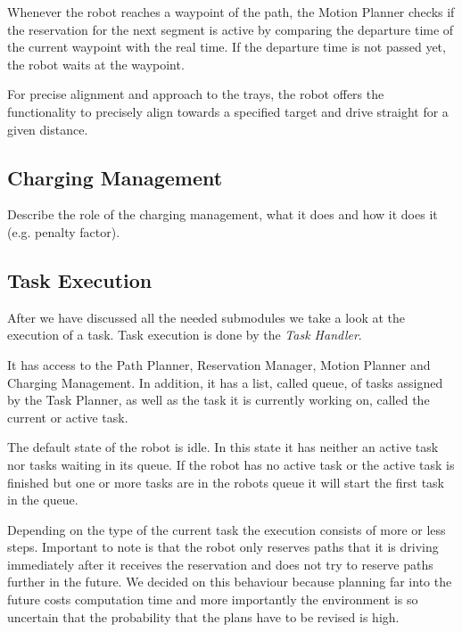 \documentclass[journal]{IEEEtran}
\begin{document}
Whenever the robot reaches a waypoint of the path, the Motion Planner checks if the reservation for the next segment is active by comparing the departure time of the current waypoint with the real time. If the departure time is not passed yet, the robot waits at the waypoint.

For precise alignment and approach to the trays, the robot offers the functionality to precisely align towards a specified target and drive straight for a given distance.

\subsection{Charging Management}
\label{subsec:charging_management}
Describe the role of the charging management, what it does and how it does it (e.g. penalty factor).


\subsection{Task Execution}
\label{subsec:task_execution}
After we have discussed all the needed submodules we take a look at the execution of a task. Task execution is done by the \textit{Task Handler}.

It has access to the Path Planner, Reservation Manager, Motion Planner and Charging Management. In addition, it has a list, called queue, of tasks assigned by the Task Planner, as well as the task it is currently working on, called the current or active task.

The default state of the robot is idle. In this state it has neither an active task nor tasks waiting in its queue. If the robot has no active task or the active task is finished but one or more tasks are in the robots queue it will start the first task in the queue.

Depending on the type of the current task the execution consists of more or less steps. Important to note is that the robot only reserves paths that it is driving immediately after it receives the reservation and does not try to reserve paths further in the future. We decided on this behaviour because planning far into the future costs computation time and more importantly the environment is so uncertain that the probability that the plans have to be revised is high.
\end{document}
